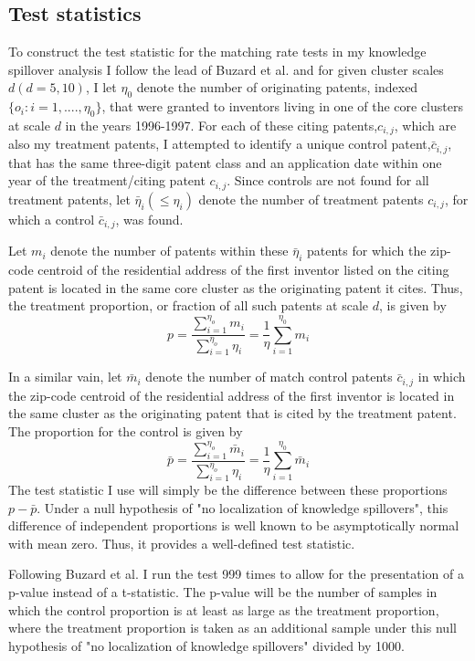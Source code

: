 \documentclass[12pt,letterpaper]{article}
\begin{document}
\subsection{Test statistics}
To construct the test statistic for the matching rate tests in my knowledge spillover analysis I follow the lead of Buzard et al. and for given cluster scales \(d(d=5,10)\), I let \(\eta_0\) denote the number of originating patents, indexed \(\{o_i:i=1,....,\eta_0\}\), that were granted to inventors living in one of the core clusters at scale \(d\) in the years 1996-1997. For each of these citing patents,\(c_{i,j}\), which are also my treatment patents, I attempted to identify a unique control patent,\(\bar{c}_{i,j}\), that has the same three-digit patent class and an application date within one year of the treatment/citing patent \(c_{i,j}\). Since controls are not found for all treatment patents, let \(\bar{\eta}_i(\leq\eta_i)\) denote the number of treatment patents \(c_{i,j}\), for which a control \(\bar{c}_{i,j}\), was found.
\par 
Let \(m_i\) denote the number of patents within these \(\bar{\eta}_i\) patents for which the zip-code centroid of the residential address of the first inventor listed on the citing patent is located in the same core cluster as the originating patent it cites. Thus, the treatment proportion, or fraction of all such patents at scale \(d\), is given by
\begin{equation}
    p = \frac{\sum_{i=1}^{\eta_o}m_i}{\sum_{i=1}^{\eta_o}\eta_i} = \frac{1}{\eta}\sum_{i=1}^{\eta_0} m_i
\end{equation}
\par 
In a similar vain, let \(\bar{m}_i\) denote the number of match control patents \(\bar{c}_{i,j}\) in which the zip-code centroid of the residential address of the first inventor is located in the same cluster as the originating patent that is cited by the treatment patent. The proportion for the control is given by
\begin{equation}
    \bar{p} = \frac{\sum_{i=1}^{\eta_o}\bar{m}_i}{\sum_{i=1}^{\eta_o}\eta_i} = \frac{1}{\eta}\sum_{i=1}^{\eta_0} \bar{m}_i
\end{equation}
The test statistic I use will simply be the difference between these proportions \(p-\bar{p}\). Under a null hypothesis of "no localization of knowledge spillovers", this difference of independent proportions is well known to be asymptotically normal with mean zero. Thus, it provides a well-defined test statistic. 
\par 
Following Buzard et al. I run the test 999 times to allow for the presentation of a p-value instead of a t-statistic. The p-value will be the number of samples in which the control proportion is at least as large as the treatment proportion, where the treatment proportion is taken as an additional sample under this null hypothesis of "no localization of knowledge spillovers" divided by 1000. 
\end{document}
